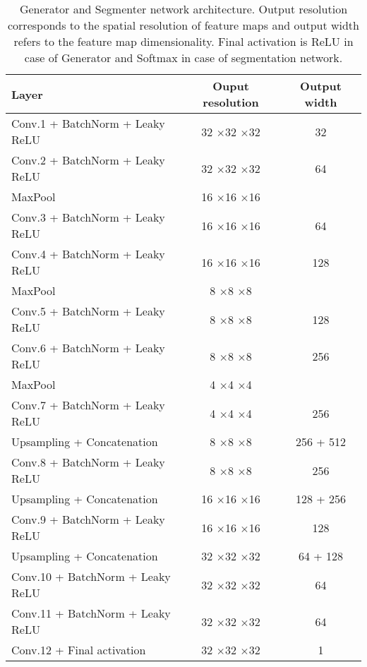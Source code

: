 \documentclass[preprint,12pt]{elsarticle}
\newcommand{\ttm}{$\times$}
\begin{document}
\begin{table}[ht]
\centering
  \begin{footnotesize}
    \begin{tabular}{lcc}
        \hline
            \textbf{Layer} & \textbf{Ouput resolution} & \textbf{Output width}\\
            \hline
            Conv.1 + BatchNorm + Leaky ReLU & 32 \ttm 32 \ttm 32 & 32 \\
            Conv.2 + BatchNorm + Leaky ReLU & 32 \ttm 32 \ttm 32 & 64 \\
            MaxPool & 16 \ttm 16 \ttm 16 & \\
            Conv.3 + BatchNorm + Leaky ReLU & 16 \ttm 16 \ttm 16 & 64 \\
            Conv.4 + BatchNorm + Leaky ReLU & 16 \ttm 16 \ttm 16 & 128 \\
            MaxPool & 8 \ttm 8 \ttm 8 & \\
            Conv.5 + BatchNorm + Leaky ReLU & 8 \ttm 8 \ttm 8 & 128 \\
            Conv.6 + BatchNorm + Leaky ReLU & 8 \ttm 8 \ttm 8 & 256 \\
            MaxPool & 4 \ttm 4 \ttm 4 & \\
            Conv.7 + BatchNorm + Leaky ReLU & 4 \ttm 4 \ttm 4 & 256 \\
            Upsampling + Concatenation & 8 \ttm 8 \ttm 8 & 256 + 512 \\
            Conv.8 + BatchNorm + Leaky ReLU & 8 \ttm 8 \ttm 8 & 256 \\
            Upsampling + Concatenation & 16 \ttm 16 \ttm 16 & 128 + 256 \\
            Conv.9 + BatchNorm + Leaky ReLU & 16 \ttm 16 \ttm 16 & 128 \\
            Upsampling + Concatenation & 32 \ttm 32 \ttm 32 &  64 + 128 \\
            Conv.10 + BatchNorm + Leaky ReLU & 32 \ttm 32 \ttm 32 & 64 \\
            Conv.11 + BatchNorm + Leaky ReLU & 32 \ttm 32 \ttm 32 & 64 \\
            Conv.12 + Final activation & 32 \ttm 32 \ttm 32 & 1 \\
        \hline
        \end{tabular}
    \end{footnotesize}
\caption{Generator and Segmenter network architecture. Output resolution corresponds to the spatial resolution of feature maps and output width refers to the feature map dimensionality. Final activation is ReLU in case of Generator and Softmax in case of segmentation network.}
\label{table1}
\end{table}
\end{document}
